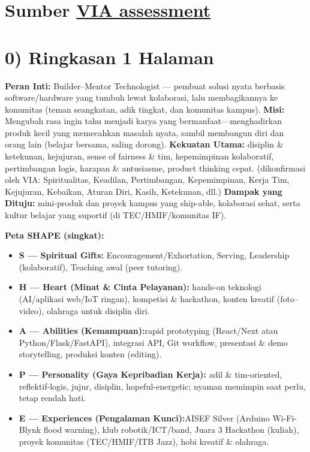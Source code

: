 \documentclass[
  letterpaper,
  DIV=11,
  numbers=noendperiod]{scrreprt}
\providecommand{\tightlist}{%
  \setlength{\itemsep}{0pt}\setlength{\parskip}{0pt}}
\begin{document}
\section{\texorpdfstring{Sumber
\href{StrengthsProfile-Muhammad-Farrel.pdf}{VIA
assessment}}{Sumber VIA assessment}}\label{sumber-via-assessment}

\section{0) Ringkasan 1 Halaman}\label{ringkasan-1-halaman}

\textbf{Peran Inti:} Builder--Mentor Technologist --- pembuat solusi
nyata berbasis software/hardware yang tumbuh lewat kolaborasi, lalu
membagikannya ke komunitas (teman seangkatan, adik tingkat, dan
komunitas kampus). \textbf{Misi:} Mengubah rasa ingin tahu menjadi karya
yang bermanfaat---menghadirkan produk kecil yang memecahkan masalah
nyata, sambil membangun diri dan orang lain (belajar bersama, saling
dorong). \textbf{Kekuatan Utama:} disiplin \& ketekunan, kejujuran,
sense of fairness \& tim, kepemimpinan kolaboratif, pertimbangan logis,
harapan \& antusiasme, product thinking cepat. (dikonfirmasi oleh VIA:
Spiritualitas, Keadilan, Pertimbangan, Kepemimpinan, Kerja Tim,
Kejujuran, Kebaikan, Aturan Diri, Kasih, Ketekunan, dll.) \textbf{Dampak
yang Dituju:} mini-produk dan proyek kampus yang ship-able, kolaborasi
sehat, serta kultur belajar yang suportif (di TEC/HMIF/komunitas IF).

\textbf{Peta SHAPE (singkat):}

\begin{itemize}
\tightlist
\item
  \textbf{S --- Spiritual Gifts:} Encouragement/Exhortation, Serving,
  Leadership (kolaboratif), Teaching awal (peer tutoring).
\item
  \textbf{H --- Heart (Minat \& Cinta Pelayanan):} hands-on teknologi
  (AI/aplikasi web/IoT ringan), kompetisi \& hackathon, konten kreatif
  (foto--video), olahraga untuk disiplin diri.
\item
  \textbf{A --- Abilities (Kemampuan):}rapid prototyping (React/Next
  atau Python/Flask/FastAPI), integrasi API, Git workflow, presentasi \&
  demo storytelling, produksi konten (editing).
\item
  \textbf{P --- Personality (Gaya Kepribadian Kerja):} adil \&
  tim-oriented, reflektif-logis, jujur, disiplin, hopeful-energetic;
  nyaman memimpin saat perlu, tetap rendah hati.
\item
  \textbf{E --- Experiences (Pengalaman Kunci):}AISEF Silver (Arduino
  Wi-Fi-Blynk flood warning), klub robotik/ICT/band, Juara 3 Hackathon
  (kuliah), proyek komunitas (TEC/HMIF/ITB Jazz), hobi kreatif \&
  olahraga.
\end{itemize}
\end{document}
